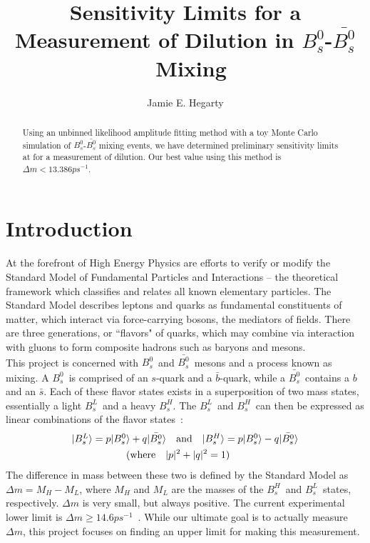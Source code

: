 \documentclass[10pt]{article}
\newcommand{\Bs}{\mbox{$B_{s}^{0}$}}
\newcommand{\Bsbar}{\mbox{$\bar{B_{s}^{0}}$}}
\newcommand{\Bsl}{\mbox{$B_{s}^{L}$}}
\newcommand{\Bsh}{\mbox{$B_{s}^{H}$}}
\begin{document}
\title{\bf Sensitivity Limits for a Measurement of Dilution in \Bs-\Bsbar\ Mixing}

\author{Jamie E. Hegarty}
\maketitle
\begin{abstract}
Using an unbinned likelihood amplitude fitting method with a toy
Monte Carlo simulation of \mbox{\Bs-\Bsbar} mixing events, we have
determined preliminary sensitivity limits at for a measurement of
dilution.  Our best value using this method is $\Delta m < 13.386
ps^{-1}$.
\end{abstract}

\section{Introduction}
\noindent At the forefront of High Energy Physics are efforts to
verify or modify the Standard Model of Fundamental Particles and
Interactions -- the theoretical framework which classifies and
relates all known elementary particles.  The Standard Model
describes leptons and quarks as fundamental constituents of
matter, which interact via force-carrying bosons, the mediators of
fields. There are three generations, or ``flavors" of quarks, which
may combine via interaction with gluons to form composite hadrons
such as baryons and mesons.\\

\noindent This project is concerned with \Bs\ and \Bsbar\ mesons
and a process known as mixing. A \Bs\ is comprised of an $s$-quark
and a $\bar{b}$-quark, while a \Bsbar\ contains a $b$ and an
$\bar{s}$. Each of these flavor states exists in a superposition
of two mass states, essentially a light \Bsl\ and a heavy \Bsh.
The \Bsl\ and \Bsh\ can then be expressed as linear combinations of the
flavor states~\cite{Bphys}:
\begin{align}
|\Bsl\rangle = p|\Bs\rangle &+ q|\Bsbar\rangle  \quad \mbox{and} \quad
|\Bsh\rangle = p|\Bs\rangle - q|\Bsbar\rangle\\
\quad (&\mbox{where} \quad |p|^2 + |q|^2 = 1) \notag
\end{align}
\noindent The difference in mass between these two
is defined by the Standard Model as $\Delta m = M_H -M_L$,
where $M_H$ and $M_L$ are the masses of the \Bsh\ and \Bsl\
states, respectively.  $\Delta m$ is very small, but always positive.
The current experimental lower limit is $\Delta m \geq 14.6 ps^{-1}$~\cite{Bphys}.
While our ultimate goal is to actually measure $\Delta m$, this project focuses on
finding an upper limit for making this measurement.\\
\end{document}
